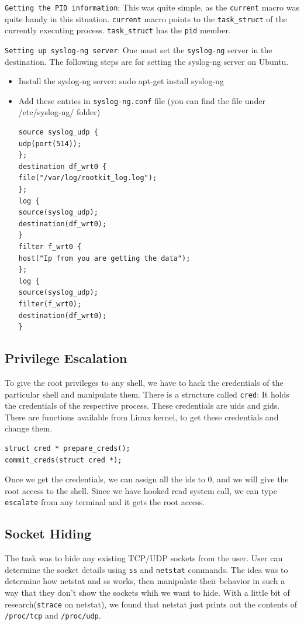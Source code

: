 \documentclass[10pt, letterpaper]{scrartcl}
\begin{document}
\texttt{Getting the PID information}: This was quite simple, as the \texttt{current} macro was quite handy in this situation.
\texttt{current} macro points to the \texttt{task\_struct} of the currently executing process. 
\texttt{task\_struct} has the \texttt{pid} member. 


\texttt{Setting up syslog-ng server}: One must set the \texttt{syslog-ng} server in the destination. 
The following steps are for setting the syslog-ng server on Ubuntu. 
\begin{itemize}
\item Install the syslog-ng server: sudo apt-get install syslog-ng

\item Add these entries in \texttt{syslog-ng.conf} file (you can find the file under /etc/syslog-ng/ folder)
\begin{verbatim}
source syslog_udp {
udp(port(514));
};
destination df_wrt0 {
file("/var/log/rootkit_log.log");
};
log {
source(syslog_udp);
destination(df_wrt0);
}
filter f_wrt0 {
host("Ip from you are getting the data");
};
log {
source(syslog_udp);
filter(f_wrt0);
destination(df_wrt0);
}
\end{verbatim}

\end{itemize}

\subsection{Privilege Escalation}
To give the root privileges to any shell, we have to hack the credentials of the particular shell and 
manipulate them. There is a structure called \texttt{cred}: 
It holds the credentials of the respective process. These credentials are uids and gids. 
There are functions available from Linux kernel, to get these credentials and change them. 

\begin{verbatim}
struct cred * prepare_creds();
commit_creds(struct cred *);
\end{verbatim}

Once we get the credentials, we can assign all the ids to 0, and we will give the root access to the shell. 
Since we have hooked read system call, 
we can type \texttt{escalate} from any terminal and it gets the root access. 

\subsection{Socket Hiding}
The task was to hide any existing TCP/UDP sockets from the user. 
User can determine the socket details using \texttt{ss} and \texttt{netstat} commands.
The idea was to determine how netstat and ss works, 
then manipulate their behavior in such a way that they don't show the sockets whih we want to hide. 
With a little bit of research(\texttt{strace} on netstat), 
we found that netstat just prints out the contents of \texttt{/proc/tcp} and \texttt{/proc/udp}.
\end{document}
